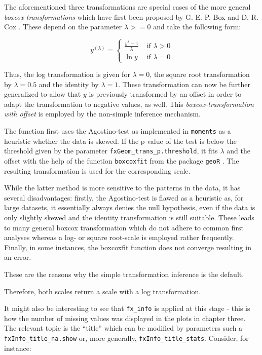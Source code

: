 \documentclass[]{report}
\theoremstyle{definition}
\theoremstyle{definition}
\theoremstyle{definition}
\theoremstyle{remark}
\begin{document}
The aforementioned three transformations are special cases of the more
general \emph{boxcox-transformations} which have first been proposed by
G. E. P. Box and D. R. Cox \citeyearpar{Box1964}. These depend on the
parameter \(\lambda>=0\) and take the following form:

\[y^{(\lambda)}=\begin{cases}\frac{y^{\lambda}-1}{\lambda}&\text{ if }\lambda > 0\\\ln y&\text{ if }\lambda = 0\end{cases}\]

Thus, the log transformation is given for \(\lambda=0\), the square root
transformation by \(\lambda =0.5\) and the identity by \(\lambda=1\).
These transformation can now be further generalized to allow that \(y\)
is previously transformed by an offset in order to adapt the
transformation to negative values, as well. This
\emph{boxcox-transformation with offset} is employed by the non-simple
inference mechanism.

The function first uses the Agostino-test as implemented in
\texttt{moments} as a heuristic whether the data is skewed. If the
p-value of the test is below the threshold given by the parameter
\texttt{fxGeom\_trans\_p.threshold}, it fits \(\lambda\) and the offset
with the help of the function \texttt{boxcoxfit} from the package
\texttt{geoR} \citep{geoR}. The resulting transformation is used for the
corresponding scale.

While the latter method is more sensitive to the patterns in the data,
it has several disadvantages: firstly, the Agostino-test is flawed as a
heuristic as, for large datasets, it essentially always denies the null
hypothesis, even if the data is only slightly skewed and the identity
transformation is still suitable. These leads to many general boxcox
transformation which do not adhere to common first analyses whereas a
log- or square root-scale is employed rather frequently. Finally, in
some instances, the boxcoxfit function does not converge resulting in an
error.

These are the reasons why the simple transformation inference is the
default.

Therefore, both scales return a scale with a log transformation.

It might also be interesting to see that \texttt{fx\_info} is applied at
this stage - this is how the number of missing values was displayed in
the plots in chapter three. The relevant topic is the ``title'' which
can be modified by parameters such a \texttt{fxInfo\_title\_na.show} or,
more generally, \texttt{fxInfo\_title\_stats}. Consider, for instance:
\end{document}
